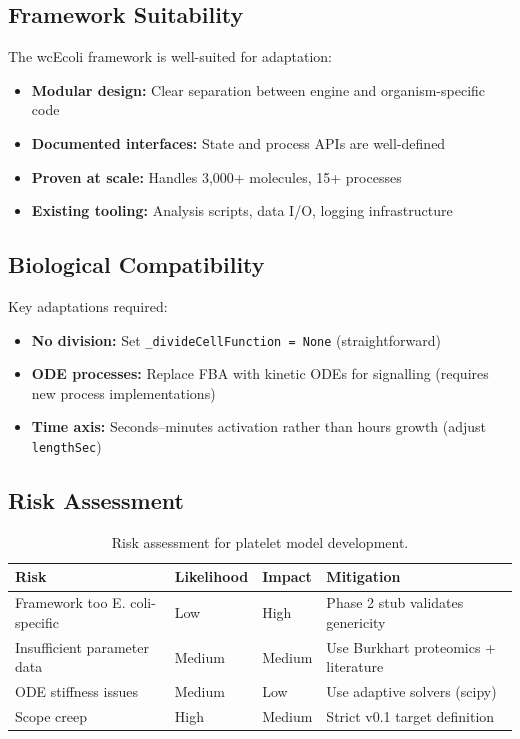 \documentclass[11pt,a4paper]{report}
\begin{document}
\subsection{Framework Suitability}

The wcEcoli framework is well-suited for adaptation:

\begin{itemize}
    \item \textbf{Modular design:} Clear separation between engine and organism-specific code
    \item \textbf{Documented interfaces:} State and process APIs are well-defined
    \item \textbf{Proven at scale:} Handles 3,000+ molecules, 15+ processes
    \item \textbf{Existing tooling:} Analysis scripts, data I/O, logging infrastructure
\end{itemize}

\subsection{Biological Compatibility}

Key adaptations required:

\begin{itemize}
    \item \textbf{No division:} Set \texttt{\_divideCellFunction = None} (straightforward)
    \item \textbf{ODE processes:} Replace FBA with kinetic ODEs for signalling (requires new process implementations)
    \item \textbf{Time axis:} Seconds--minutes activation rather than hours growth (adjust \texttt{lengthSec})
\end{itemize}

\subsection{Risk Assessment}

\begin{table}[h]
\centering
\begin{tabular}{llll}
\toprule
\textbf{Risk} & \textbf{Likelihood} & \textbf{Impact} & \textbf{Mitigation} \\
\midrule
Framework too E. coli-specific & Low & High & Phase 2 stub validates genericity \\
Insufficient parameter data & Medium & Medium & Use Burkhart proteomics + literature \\
ODE stiffness issues & Medium & Low & Use adaptive solvers (scipy) \\
Scope creep & High & Medium & Strict v0.1 target definition \\
\bottomrule
\end{tabular}
\caption{Risk assessment for platelet model development.}
\end{table}
\end{document}
